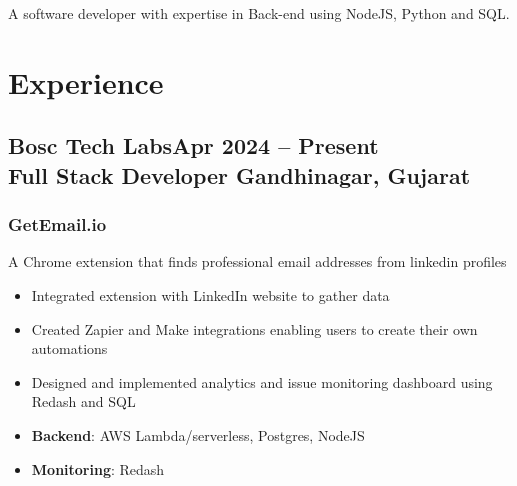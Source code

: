\documentclass[a4paper]{article}
\newcommand{\experiencetitle}[4]{\subsection{\texorpdfstring{#1\hfill \small \textmd{#4} \\
	\textmd{#3} \hfill \textmd{#2}}{#1}}}
\begin{document}
\fancyhead[L]{
}


\fancyhead[R]{
}

\noindent
A software developer with expertise in Back-end using NodeJS, Python and SQL.

\section{Experience}
\experiencetitle
{Bosc Tech Labs}{Gandhinagar, Gujarat}
{Full Stack Developer}{Apr 2024 -- Present}
\subsubsection{GetEmail.io}
A Chrome extension that finds professional email addresses from linkedin profiles
\begin{itemize}
	\item Integrated extension with LinkedIn website to gather data
	\item Created Zapier and Make integrations enabling users to create their own automations
	\item Designed and implemented analytics and issue monitoring dashboard using Redash and SQL
	\item \textbf{Backend}: AWS Lambda/serverless, Postgres, NodeJS
	\item \textbf{Monitoring}: Redash
\end{itemize}

\end{document}
